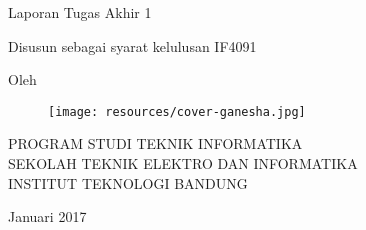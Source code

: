 \clearpage
\pagestyle{empty}

\begin{center}
\smallskip

    \Large \bfseries \MakeUppercase{\thetitle}
    \vfill

    \Large Laporan Tugas Akhir 1
    \vfill

    \large Disusun sebagai syarat kelulusan IF4091
    \vfill

    \large Oleh

    \Large \theauthor

    \vfill
    \begin{figure}[h]
        \centering
            \texttt{[image: resources/cover-ganesha.jpg]}
    \end{figure}
    \vfill

    \large
    \uppercase{
        Program Studi Teknik Informatika \\
        Sekolah Teknik Elektro dan Informatika \\
        Institut Teknologi Bandung
    }

    Januari 2017
\end{center}

\clearpage
